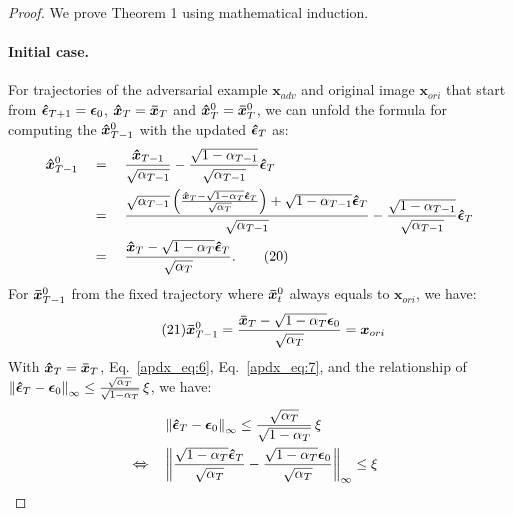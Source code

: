 \documentclass{article}
\newtheorem{proof}{Proof}
\begin{document}
\begin{proof}
We prove Theorem 1 using mathematical induction. 
\paragraph{Initial case.} For trajectories of the adversarial example $\boldsymbol{x}_{adv}$ and original image $\boldsymbol{x}_{ori}$ that start from $\boldsymbol{\Hat{\epsilon}}_{T+1} = \boldsymbol{\epsilon}_0$, $\boldsymbol{\Hat{x}}_T = \boldsymbol{\Bar{x}}_T$ and $\boldsymbol{\Hat{x}}_T^0 = \boldsymbol{\Bar{x}}_T^0$, we can unfold the formula for computing the $\boldsymbol{\Hat{x}}_{T-1}^0$ with the updated $\boldsymbol{\Hat{\epsilon}}_{T}$ as: 
\begin{alignat}{3}
&\boldsymbol{\Hat{x}}_{T-1}^{0} && = \; && \frac{\boldsymbol{\Hat{x}}_{T-1}}{\sqrt{\alpha_{T-1}}} - \frac{\sqrt{1-\alpha_{T-1}}}{\sqrt{\alpha_{T-1}}}\boldsymbol{\Hat{\epsilon}}_{T} \notag \\
& && = \; && \frac{\sqrt{\alpha_{T-1}}\left(\frac{\boldsymbol{\Hat{x}}_T-\sqrt{1-\alpha_T}\boldsymbol{\Hat{\epsilon}}_T}{\sqrt{\alpha_T}}\right) + \sqrt{1-\alpha_{T-1}}\boldsymbol{\Hat{\epsilon}}_T}{\sqrt{\alpha_{T-1}}} \notag  - \frac{\sqrt{1-\alpha_{T-1}}}{\sqrt{\alpha_{T-1}}}\boldsymbol{\Hat{\epsilon}}_{T} \notag \\
& && = \; && \frac{\boldsymbol{\Hat{x}}_T-\sqrt{1-\alpha_T}\boldsymbol{\Hat{\epsilon}}_T}{\sqrt{\alpha_T}}. \tag{20} \label{apdx_eq:6}
\end{alignat}
For $\boldsymbol{\Bar{x}}_{T-1}^0$ from the fixed trajectory where $\boldsymbol{\Bar{x}}_{t}^0$ always equals to $\boldsymbol{x}_{ori}$, we have:
\begin{equation}\tag{21}
\boldsymbol{\Bar{x}}_{T-1}^{0} = \frac{\boldsymbol{\Bar{x}}_T-\sqrt{1-\alpha_T}\boldsymbol{{\epsilon}}_0}{\sqrt{\alpha_T}} = \boldsymbol{x}_{ori}
\label{apdx_eq:7}
\end{equation}
With  $\boldsymbol{\Hat{x}}_T = \boldsymbol{\Bar{x}}_T$, Eq.~\eqref{apdx_eq:6}, Eq.~\eqref{apdx_eq:7}, and the relationship of $\left\|\boldsymbol{\Hat{\epsilon}}_{T} - \boldsymbol{\epsilon}_0\right\|_\infty \leq \frac{\sqrt{\alpha_{T}}}{\sqrt{1-\alpha_{T}}} \, \xi$, we have:
\begin{alignat}{3}
&  && \left\|\boldsymbol{\Hat{\epsilon}}_{T} - \boldsymbol{\epsilon}_0\right\|_\infty \leq \frac{\sqrt{\alpha_{T}}}{\sqrt{1-\alpha_{T}}} \, \xi & \notag \\
& \xLeftrightarrow{} && \left\|\frac{\sqrt{1-\alpha_{T}}\boldsymbol{\Hat{\epsilon}}_{T}}{\sqrt{\alpha_{T}}} - \frac{\sqrt{1-\alpha_{T}}\boldsymbol{\epsilon}_0}{\sqrt{\alpha_{T}}}\right\|_\infty \leq \xi & \notag \\

\end{alignat}
\end{proof}
\end{document}
